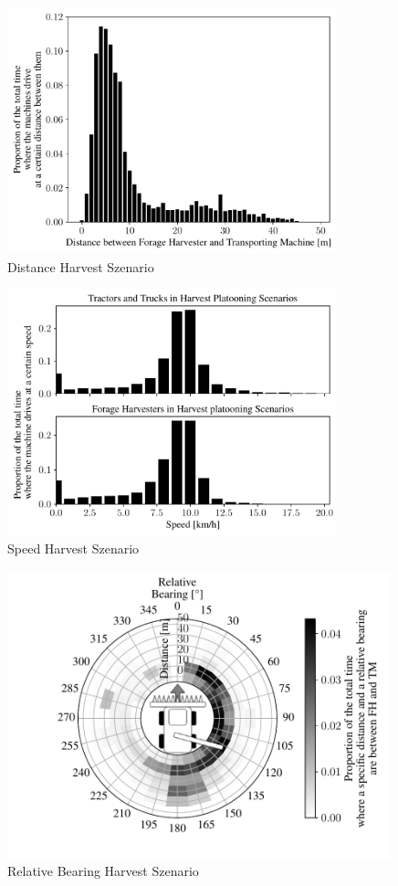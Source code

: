 \documentclass[]{nsm-thesis}
\begin{document}
\begin{figure}%
	\centering
	\includegraphics[width=0.85\textwidth]{figures/distanceHarvestSzenario.pdf}
	\caption{Distance Harvest Szenario}%
	\label{fig:distance}%
\end{figure}
\begin{figure}%
	\centering
	\includegraphics[width=0.85\textwidth]{figures/speedHarvestSzenario.pdf}
	\caption{Speed Harvest Szenario}%
	\label{fig:speed}%
\end{figure}
\begin{figure}%
	\centering
	\includegraphics[width=0.99\textwidth]{figures/bearingHarvestScenario.pdf}
	\caption{Relative Bearing Harvest Szenario}%
	\label{fig:bearing}%
\end{figure}
\end{document}
